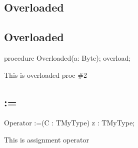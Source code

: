 \documentclass{report}
\newif\ifpdf
\begin{document}
\subsection*{\large{\textbf{Overloaded}}\normalsize\hspace{1ex}\hrulefill}
\else
\subsection*{Overloaded}
\fi
\label{ok_parse_impl-Overloaded}
\begin{list}{}{
\setlength{\itemindent}{0cm}
\setlength{\listparindent}{0cm}
\setlength{\leftmargin}{\evensidemargin}
\addtolength{\leftmargin}{\tmplength}
\settowidth{\labelsep}{X}
\addtolength{\leftmargin}{\labelsep}
\setlength{\labelwidth}{\tmplength}
}
\item[\textbf{Declaration}\hfill]
\ifpdf
\begin{flushleft}
\fi
\begin{ttfamily}
procedure Overloaded(a: Byte); overload;\end{ttfamily}

\ifpdf
\end{flushleft}
\fi

\par
\item[\textbf{Description}]
This is overloaded proc {\#}2

\end{list}
\ifpdf
\subsection*{\large{\textbf{:=}}\normalsize\hspace{1ex}\hrulefill}
\else
\subsection*{:=}
\fi
\label{ok_parse_impl-:=}
\index{:=}
\begin{list}{}{
\setlength{\itemindent}{0cm}
\setlength{\listparindent}{0cm}
\setlength{\leftmargin}{\evensidemargin}
\addtolength{\leftmargin}{\tmplength}
\settowidth{\labelsep}{X}
\addtolength{\leftmargin}{\labelsep}
\setlength{\labelwidth}{\tmplength}
}
\item[\textbf{Declaration}\hfill]
\ifpdf
\begin{flushleft}
\fi
\begin{ttfamily}
Operator :=(C : TMyType) z : TMyType;\end{ttfamily}

\ifpdf
\end{flushleft}
\fi

\par
\item[\textbf{Description}]
This is assignment operator

\end{list}
\end{document}
